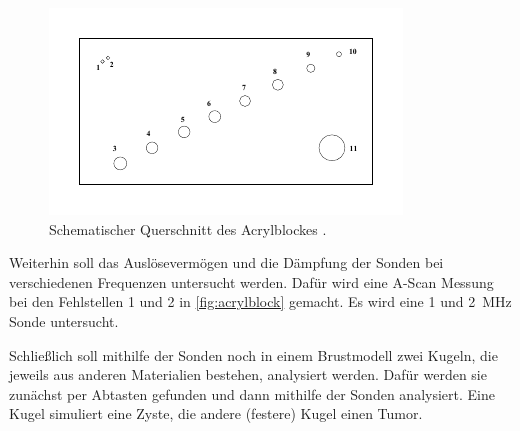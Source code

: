 \begin{figure}
    \centering
    \includegraphics[width=0.75\linewidth]{pictures/acrylblock.pdf}
    \caption{Schematischer Querschnitt des Acrylblockes \cite{us2}.}
    \label{fig:acrylblock}
\end{figure}

Weiterhin soll das Auslösevermögen und die Dämpfung der Sonden bei verschiedenen Frequenzen untersucht werden.
Dafür wird eine A-Scan Messung bei den Fehlstellen 1 und 2 in \autoref{fig:acrylblock} gemacht.
Es wird eine 1 und \qty{2}{\MHz} Sonde untersucht. 

Schließlich soll mithilfe der Sonden noch in einem Brustmodell zwei Kugeln, die jeweils aus anderen Materialien bestehen, analysiert werden.
Dafür werden sie zunächst per Abtasten gefunden und dann mithilfe der Sonden analysiert.
Eine Kugel simuliert eine Zyste, die andere (festere) Kugel einen Tumor.